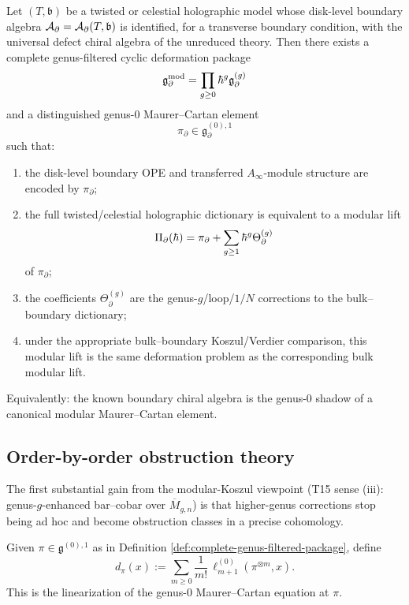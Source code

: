\begin{conjecture}
Let $(T,\mathfrak b)$ be a twisted or celestial holographic model whose disk-level boundary
algebra $\mathcal A_\partial=\mathcal A_\partial(T,\mathfrak b)$ is identified, for a transverse boundary
condition, with the universal defect chiral algebra of the unreduced theory. Then there exists
a complete genus-filtered cyclic deformation package
\[
\mathfrak g^{\mathrm{mod}}_\partial=\prod_{g\ge 0}\hbar^g\mathfrak g^{(g)}_\partial
\]
and a distinguished genus-$0$ Maurer--Cartan element
\[
\pi_\partial\in \mathfrak g_\partial^{(0),1}
\]
such that:
\begin{enumerate}[label=\textup{(\roman*)}]
\item the disk-level boundary OPE and transferred $A_\infty$-module structure are encoded by
$\pi_\partial$;
\item the full twisted/celestial holographic dictionary is equivalent to a modular lift
\[
\Pi_\partial(\hbar)=\pi_\partial+\sum_{g\ge 1}\hbar^g\Theta_\partial^{(g)}
\]
of $\pi_\partial$;
\item the coefficients $\Theta_\partial^{(g)}$ are the genus-$g$/loop/$1/N$ corrections to the
bulk--boundary dictionary;
\item under the appropriate bulk--boundary Koszul/Verdier comparison, this modular lift is the
same deformation problem as the corresponding bulk modular lift.
\end{enumerate}
Equivalently: the known boundary chiral algebra is the genus-$0$ shadow of a canonical
modular Maurer--Cartan element.
\end{conjecture}

\subsection{Order-by-order obstruction theory}

The first substantial gain from the modular-Koszul viewpoint (T15 sense (iii): genus-$g$-enhanced bar--cobar over $\overline M_{g,n}$) is that higher-genus corrections stop
being ad hoc and become obstruction classes in a precise cohomology.

\begin{definition}
Given $\pi\in\mathfrak g^{(0),1}$ as in Definition
\ref{def:complete-genus-filtered-package}, define
\begin{equation}
d_\pi(x):=\sum_{m\ge 0}\frac1{m!}\,\ell_{m+1}^{(0)}(\pi^{\otimes m},x).
\end{equation}
This is the linearization of the genus-$0$ Maurer--Cartan equation at $\pi$.
\end{definition}

